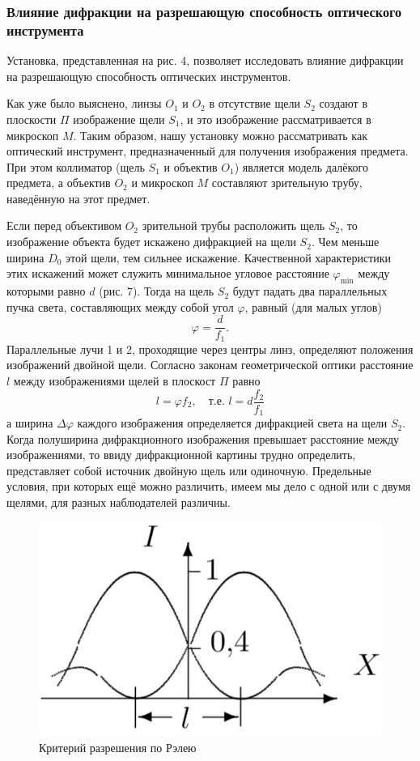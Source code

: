 \documentclass[a4paper, 12pt]{article}
\begin{document}
	\subsubsection{Влияние дифракции на разрешающую способность оптического инструмента}
	Установка, представленная на рис. 4, позволяет исследовать влияние дифракции на разрешающую способность оптических инструментов.\par
	Как уже было выяснено, линзы $O_1$ и $O_2$ в отсутствие щели $S_2$ создают в плоскости $\Pi$ изображение щели $S_1$, и это изображение рассматривается в микроскоп $M$. Таким образом, нашу установку можно рассматривать как оптический инструмент, предназначенный для получения изображения предмета. При этом коллиматор (щель $S_1$ и объектив $O_1$) является модель далёкого предмета, а объектив $O_2$ и микроскоп $M$ составляют зрительную трубу, наведённую на этот предмет.\par
	Если перед объективом $O_2$ зрительной трубы расположить щель $S_2$, то изображение объекта будет искажено дифракцией на щели $S_2$. Чем меньше ширина $D_0$ этой щели, тем сильнее искажение. Качественной характеристики этих искажений может служить минимальное угловое расстояние $\varphi_{\min}$ между которыми равно $d$ (рис. 7). Тогда на щель $S_2$ будут падать два параллельных пучка света, составляющих между собой угол $\varphi$, равный (для малых углов)
	\begin{equation}
		\varphi=\frac{d}{f_1}.
	\end{equation}
	Параллельные лучи 1 и 2, проходящие через центры линз, определяют положения изображений двойной щели. Согласно законам геометрической оптики расстояние $l$ между изображениями щелей в плоскост $\Pi$ равно
	\begin{equation}
		l=\varphi f_2, \quad \text{т.е. }l=d\frac{f_2}{f_1}
	\end{equation}
	а ширина $\Delta\varphi$ каждого изображения определяется дифракцией света на щели $S_2$. Когда полуширина дифракционного изображения превышает расстояние между изображениями, то ввиду дифракционной картины трудно определить, представляет собой источник двойную щель или одиночную. Предельные условия, при которых ещё можно различить, имеем мы дело с одной или с двумя щелями, для разных наблюдателей различны.\par
	\begin{figure}
		\includegraphics[scale=0.2]{Fig4.png}
		\caption{Критерий разрешения по Рэлею}
		\label{pic:5}
	\end{figure}
\end{document}
